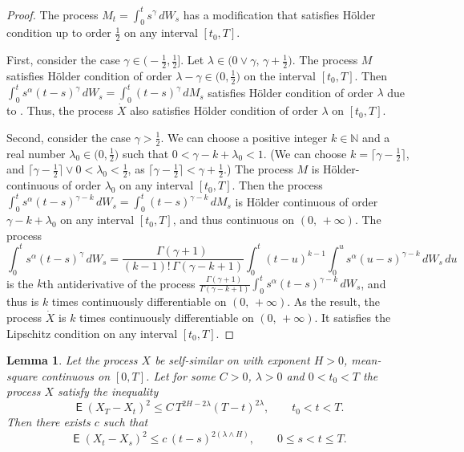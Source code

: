 \documentclass{article}
\DeclareMathOperator{\ME}{\mathsf{E}}
\DeclareMathOperator{\funceil}{ceil}
\newcommand{\dotX}{\dot{X}}
\theoremstyle{plain}
\newtheorem{lemma}{Lemma}
\theoremstyle{remark}
\theoremstyle{definition}
\begin{document}
\begin{proof}
The process $M_t = \int_0^t s^\gamma \, dW_s$
has a modification that satisfies H\"older
condition up to order $\frac12$ on any interval $[t_0,T]$.

First, consider the case $\gamma\in\bigl(-\frac12,\frac12\bigr]$.
Let $\lambda \in \bigl(0 \mathbin{\vee} \gamma,\,\allowbreak \gamma+\frac12
\bigr)$.
The process $M$ satisfies H\"older condition of
order $\lambda-\gamma \in \bigl(0, \frac12)$
on the interval $[t_0, T]$.
Then $\int_0^t s^\alpha (t-s)^\gamma \, dW_s = \int_0^t
(t-s)^\gamma \, dM_s$
satisfies H\"older condition of order $\lambda$
due to \cite[Lemma~2.1]{Norros1999}.
Thus, the process $\dotX$ also satisfies
H\"older condition of order $\lambda$ on $[t_0,T]$.

Second, consider the case $\gamma > \frac12$.
We can choose a positive integer $k\in\mathbb{N}$ and a real number
$\lambda_0 \in \bigl(0,\frac12\bigr)$
such that $0<\gamma - k + \lambda_0 < 1$.
	(We can choose $k = \lceil \gamma-\frac12\rceil$,
	and $\lceil \gamma-\frac12\rceil \vee 0 < \lambda_0 < \frac12$,
	as $\lceil \gamma-\frac12 \rceil < \gamma+\frac12$.)
The process $M$ is H\"older-continuous
of order $\lambda_0$ on any interval $[t_0, T]$.
Then the process
$\int_0^t s^\alpha (t-s)^{\gamma-k} \, dW_s = \int_0^t
(t-s)^{\gamma-k} \, dM_s$
is H\"older continuous of order
$\gamma - k + \lambda_0$ on any interval $[t_0, T]$, and thus
continuous on $(0,\, {+}\infty)$.
The process
\[
\int_0^t s^\alpha (t-s)^\gamma \, dW_s
= \frac{\Gamma(\gamma{+}1)\, }  {(k{-}1)! \,  \Gamma(\gamma{-}k{+}1)}
\int_0^t (t-u)^{k-1} \int_0^u s^\alpha (u-s)^{\gamma-k} \, dW_s  \, du
\]
is the $k$th antiderivative of the process
$\frac{\Gamma(\gamma{+}1)\, }  { \Gamma(\gamma-k+1)}
\int_0^t s^\alpha (t-s)^{\gamma-k} \, dW_s$,
and thus is $k$ times continuously differentiable on
$(0,\, {+}\infty)$.
As the result, the process $\dotX$
is $k$ times continuously differentiable on
$(0,\, {+}\infty)$.
It satisfies the Lipschitz condition on
any interval $[t_0, T]$.
\end{proof}


\begin{lemma}\label{lem:Lemma-upperhelix}
Let the process $X$ be self-similar on with exponent $H>0$,
mean-square continuous on $[0,T]$.  Let for some
$C>0$, $\lambda>0$ and $0<t_0<T$
the process $X$ satisfy the inequality
\[
\ME(X_T - X_t)^2 \le C\, T^{2H-2\lambda} (T - t)^{2\lambda} , \qquad
t_0\mathbin{<}t\mathbin{<}T.
\]
Then there exists $c$ such that
\[
\ME(X_t - X_s)^2 \le c\, (t-s)^{2 (\lambda \wedge H)} , \qquad
0\mathbin{\le}s\mathbin{<}t\mathbin{\le}T.
\]
\end{lemma}
\end{document}
